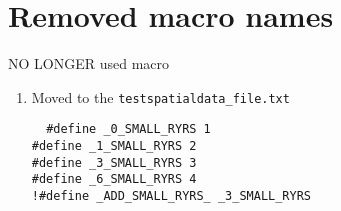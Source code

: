 \section{Removed macro names}

NO LONGER used macro
\begin{enumerate}
  \item Moved to the \verb!testspatialdata_file.txt!
  \begin{verbatim}
  #define _0_SMALL_RYRS 1
#define _1_SMALL_RYRS 2
#define _3_SMALL_RYRS 3
#define _6_SMALL_RYRS 4
!#define _ADD_SMALL_RYRS_ _3_SMALL_RYRS
  \end{verbatim}
\end{enumerate}